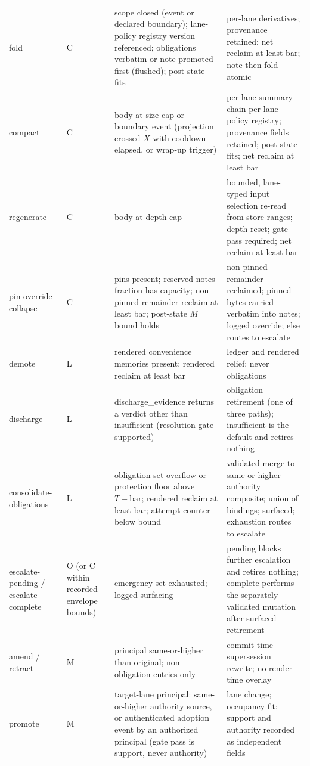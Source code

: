 \documentclass[11pt]{article}
\begin{document}
{\begin{longtable}{@{}p{2.35cm}p{1.15cm}p{4.6cm}p{5.6cm}@{}}
fold & C & scope closed (event or declared boundary); lane-policy registry version referenced; obligations verbatim or note-promoted first (flushed); post-state fits & per-lane derivatives; provenance retained; net reclaim at least bar; note-then-fold atomic \\
compact & C & body at size cap or boundary event (projection crossed $X$ with cooldown elapsed, or wrap-up trigger) & per-lane summary chain per lane-policy registry; provenance fields retained; post-state fits; net reclaim at least bar \\
regenerate & C & body at depth cap & bounded, lane-typed input selection re-read from store ranges; depth reset; gate pass required; net reclaim at least bar \\
pin-override-collapse & C & pins present; reserved notes fraction has capacity; non-pinned remainder reclaim at least bar; post-state $M$ bound holds & non-pinned remainder reclaimed; pinned bytes carried verbatim into notes; logged override; else routes to escalate \\
demote & L & rendered convenience memories present; rendered reclaim at least bar & ledger and rendered relief; never obligations \\
discharge & L & discharge\_evidence returns a verdict other than insufficient (resolution gate-supported) & obligation retirement (one of three paths); insufficient is the default and retires nothing \\
consolidate-obligations & L & obligation set overflow or protection floor above $T - \mathrm{bar}$; rendered reclaim at least bar; attempt counter below bound & validated merge to same-or-higher-authority composite; union of bindings; surfaced; exhaustion routes to escalate \\
escalate-pending / escalate-complete & O (or C within recorded envelope bounds) & emergency set exhausted; logged surfacing & pending blocks further escalation and retires nothing; complete performs the separately validated mutation after surfaced retirement \\
amend / retract & M & principal same-or-higher than original; non-obligation entries only & commit-time supersession rewrite; no render-time overlay \\
promote & M & target-lane principal: same-or-higher authority source, or authenticated adoption event by an authorized principal (gate pass is support, never authority) & lane change; occupancy fit; support and authority recorded as independent fields \\

\end{longtable}}
\end{document}
